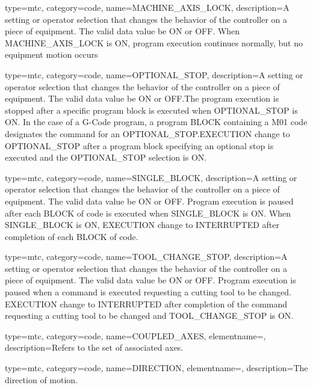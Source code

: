 {
  type=mtc,
  category=code,
  name={MACHINE\_AXIS\_LOCK},
  description={A setting or operator selection that changes the behavior of the controller on a piece of equipment.  The \gls{valid data value} \must be ON or OFF. \newline When MACHINE\_AXIS\_LOCK is ON, program execution continues normally, but no equipment motion occurs }
}

{
  type=mtc,
  category=code,
  name={OPTIONAL\_STOP},
  description={A setting or operator selection that changes the behavior of the controller on a piece of equipment.  The \gls{valid data value} \must be ON or OFF.The program execution is stopped after a specific program block is executed when OPTIONAL\_STOP is ON.    \newline In the case of a G-Code program, a program BLOCK containing a M01 code designates the command for an OPTIONAL\_STOP.EXECUTION \must change to OPTIONAL\_STOP after a program block specifying an optional stop is executed and the OPTIONAL\_STOP selection is ON.}
}

{
  type=mtc,
  category=code,
  name={SINGLE\_BLOCK},
  description={A setting or operator selection that changes the behavior of the controller on a piece of equipment.  The \gls{valid data value} \must be ON or OFF. Program execution is paused after each BLOCK of code is executed when SINGLE\_BLOCK is ON.   \newline When SINGLE\_BLOCK is ON, EXECUTION \must change to INTERRUPTED after completion of each BLOCK of code. }
}

{
  type=mtc,
  category=code,
  name={TOOL\_CHANGE\_STOP},
  description={A setting or operator selection that changes the behavior of the controller on a piece of equipment.  The \gls{valid data value} \must be ON or OFF. Program execution is paused when a command is executed requesting a cutting tool to be changed. EXECUTION \must change to INTERRUPTED after completion of the command requesting a cutting tool to be changed and TOOL\_CHANGE\_STOP is ON.}
}

{
  type=mtc,
  category=code,
  name={COUPLED\_AXES},
  elementname=,
  description={Refers to the set of associated axes.}
}

{
  type=mtc,
  category=code,
  name={DIRECTION},
  elementname=,
  description={The direction of motion.}
}

